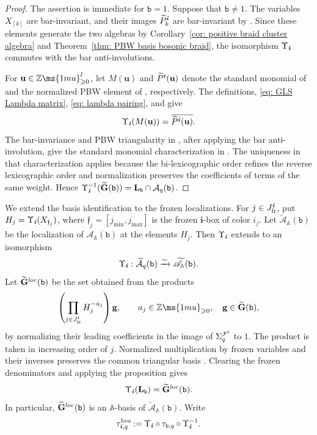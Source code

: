 \documentclass[12pt, leqno]{amsart}
\numberwithin{equation}{section}
\theoremstyle{plain}
\theoremstyle{definition}
\renewcommand{\ge}{\geqslant}
\newcommand{\seteq}{\mathbin{:=}}
\newcommand{\fr}{\mathrm{fr}}
\newcommand{\Z}{\mathbb{Z}\ms{1mu}}
\newcommand{\loc}{{\rm loc}}
\newcommand{\ii}{ \textbf{\textit{i}}}
\newcommand{\frakf}{\mathfrak{f}}
\newcommand{\bbA}{\mathbb{A}}
\newcommand{\bfG}{\mathbf{G}}
\newcommand{\bfL}{\mathbf{L}}
\newcommand{\tbfG}{\widetilde{\bfG}}
\newcommand{\bfg}{\mathbf{g}}
\newcommand{\bfi}{\mathbf{i}}
\newcommand{\bfu}{\mathbf{u}}
\newcommand{\calA}{\mathcal{A}}
\newcommand{\calF}{\mathcal{F}}
\newcommand{\tcalA}{\widetilde{\calA}}
\newcommand{\scrA}{\mathscr{A}}
\newcommand{\ttb}{\mathtt{b}}
\begin{document}
\begin{proof}
The assertion is immediate for $\ttb=1$. Suppose that $\ttb\ne1$.
The variables $X_{[k]}$ are bar-invariant, and their images
$\widetilde P_k^\ii$ are bar-invariant by
\cite[(2.4) and Lemma~4.17]{KKOP24B}. Since these elements generate the two algebras by
Corollary~\ref{cor: positive braid cluster algebra} and
Theorem~\ref{thm: PBW basis bosonic braid}, the isomorphism
$\Upsilon_\ii$ commutes with the bar anti-involutions.

For $\bfu\in\Z_{\ge0}^l$, let $M(\bfu)$ and
$\widetilde P^\ii(\bfu)$ denote the standard monomial of
\cite[Section~8.3]{Qin24A} and the normalized PBW element of
\cite[(2.4) and (4.7)]{KKOP24B}, respectively. The definitions,
\eqref{eq: GLS Lambda matrix}, \eqref{eq: lambda pairing}, and
\cite[Lemma~8.4]{Qin24A} give
\[
\Upsilon_\ii(M(\bfu))=\overline{\widetilde P^\ii(\bfu)}.
\]
The bar-invariance and PBW triangularity in
\cite[Definition~4.14 and Lemmas~4.16--4.17]{KKOP24B}, after applying
the bar anti-involution, give the standard monomial characterization in
\cite[Definition~2.20 and Theorem~8.10(4)]{Qin24A}. The uniqueness in
that characterization applies because the bi-lexicographic order
refines the reverse lexicographic order and normalization preserves
the coefficients of terms of the same weight. Hence
$\Upsilon_\ii^{-1}(\tbfG(\ttb))=\bfL_\ttb\cap\calA_q(\ttb)$.
\end{proof}

We extend the basis identification to the frozen localizations.
For $j\in J^\ii_{\fr}$, put
$H_j=\Upsilon_\ii(X_{\frakf_j})$, where
$\frakf_j=[j_{\min},j_{\max}]$ is the frozen $\bfi$-box of
color $i_j$.
Let $\widetilde{\scrA}_\bbA(\ttb)$ be the localization of
$\scrA_\bbA(\ttb)$ at the elements $H_j$.
Then $\Upsilon_\ii$ extends to an isomorphism
\[
\Upsilon_\ii:\tcalA_q(\ttb)
\xrightarrow{\sim}\widetilde{\scrA}_\bbA(\ttb).
\]
Let $\tbfG^{\loc}(\ttb)$ be the set obtained from the products
\[
\left(\prod_{j\in J^\ii_{\fr}}H_j^{-a_j}\right)\bfg,
\qquad a_j\in\Z_{\ge0},\quad \bfg\in\tbfG(\ttb),
\]
by normalizing their leading coefficients in the image of
$\Sigma_q^{\calF^\ii}$ to $1$.
The product is taken in increasing order of $j$.
Normalized multiplication by frozen variables and their inverses
preserves the common triangular basis
\cite[Definition~2.20]{Qin24A}.
Clearing the frozen denominators and applying the proposition gives
\[
\Upsilon_\ii(\bfL_\ttb)=\tbfG^{\loc}(\ttb).
\]
In particular, $\tbfG^{\loc}(\ttb)$ is an $\bbA$-basis of
$\widetilde{\scrA}_\bbA(\ttb)$.
Write
\[
\tau^{\mathrm{bos}}_{\ii,q}
\seteq\Upsilon_\ii\circ\tau_{\ttb,q}\circ\Upsilon_\ii^{-1}.
\]
\end{document}

